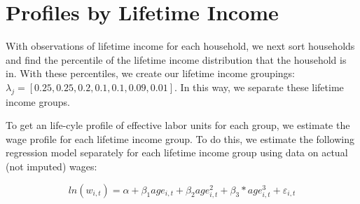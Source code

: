\documentclass[article,11pt,letterpaper,fleqn]{article}
\theoremstyle{definition}
\numberwithin{equation}{section}
\begin{document}
\section{Profiles by Lifetime Income}
With observations of lifetime income for each household, we next sort households and find the percentile of the lifetime income distribution that the household is in.  With these percentiles, we create our lifetime income groupings: $\lambda_{j}=[0.25, 0.25, 0.2, 0.1, 0.1, 0.09, 0.01]$. In this way, we separate these lifetime income groups.

To get an life-cyle profile of effective labor units for each group, we estimate the wage profile for each lifetime income group.  To do this, we estimate the following regression model separately for each lifetime income group using data on actual (not imputed) wages:

\begin{equation}
\label{eqn:wage_profile}
ln(w_{i,t})=\alpha +  \beta_{1}age_{i,t} + \beta_{2}age_{i,t}^{2} + \beta_{3}*age_{i,t}^{3}+ \varepsilon_{i,t}
\end{equation}



\end{document}
